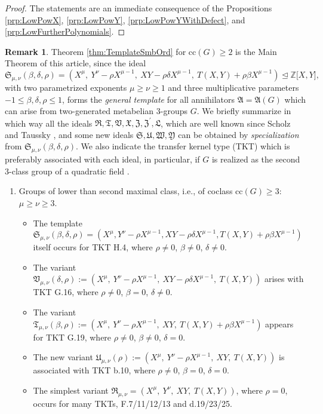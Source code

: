 \documentclass{amsart}
\theoremstyle{definition}
\newtheorem{remark}{Remark}[section]
\numberwithin{equation}{section}
\begin{document}
\begin{proof}
The statements are an immediate consequence of the Propositions
\ref{prp:LowPowX},
\ref{prp:LowPowY},
\ref{prp:LowPowYWithDefect},
and
\ref{prp:LowFurtherPolynomials}.
\end{proof}


\begin{remark}
\label{rmk:TemplateSmbOrd}
Theorem
\ref{thm:TemplateSmbOrd}
for \(\mathrm{cc}(G)\ge 2\)
is the Main Theorem of this article, since the ideal
\[\mathfrak{S}_{\mu,\nu}(\beta,\delta,\rho)
=\left(X^{\mu},\ Y^{\nu}-\rho X^{\mu-1},\ XY-\rho\delta X^{\mu-1},\ T(X,Y)+\rho\beta X^{\mu-1}\right)
\unlhd\mathbb{Z}\lbrack X,Y\rbrack,\]
with two parametrized exponents \(\mu\ge\nu\ge 1\) and three multiplicative parameters \(-1\le\beta,\delta,\rho\le 1\),
forms the \textit{general template} for all annihilators \(\mathfrak{A}=\mathfrak{A}(G)\)
which can arise from two-generated metabelian \(3\)-groups \(G\).
We briefly summarize in which way all the ideals
\(\mathfrak{R},\mathfrak{T},\mathfrak{V},\mathfrak{X},\mathfrak{Z},\mathfrak{Z}^\prime,\mathfrak{L}\),
which are well known since Scholz and Taussky
\cite[(6), p. 32]{SoTa},
and some new ideals \(\mathfrak{S},\mathfrak{U},\mathfrak{W},\mathfrak{Y}\)
can be obtained by \textit{specialization} from \(\mathfrak{S}_{\mu,\nu}(\beta,\delta,\rho)\).
We also indicate the transfer kernel type (TKT)
\cite{Ma2}
which is preferably associated with each ideal,
in particular, if \(G\) is realized as the second \(3\)-class group of a quadratic field
\cite{Ma4}.

\begin{enumerate}

\item
Groups of lower than second maximal class, i.e., of coclass \(\mathrm{cc}(G)\ge 3\):
\(\mu\ge\nu\ge 3\).

\begin{itemize}
\item
The template
\(\mathfrak{S}_{\mu,\nu}(\beta,\delta,\rho)
=\left(X^{\mu},Y^{\nu}-\rho X^{\mu-1},XY-\rho\delta X^{\mu-1},T(X,Y)+\rho\beta X^{\mu-1}\right)\)
itself occurs for TKT H.4, where \(\rho\ne 0\), \(\beta\ne 0\), \(\delta\ne 0\).
\item
The variant
\(\mathfrak{V}_{\mu,\nu}(\delta,\rho)
:=\left(X^{\mu},\ Y^{\nu}-\rho X^{\mu-1},\ XY-\rho\delta X^{\mu-1},\ T(X,Y)\right)\)
arises with TKT G.16, where \(\rho\ne 0\), \(\beta=0\), \(\delta\ne 0\).
\item
The variant
\(\mathfrak{T}_{\mu,\nu}(\beta,\rho)
:=\left(X^{\mu},\ Y^{\nu}-\rho X^{\mu-1},\ XY,\ T(X,Y)+\rho\beta X^{\mu-1}\right)\)
appears for TKT G.19, where \(\rho\ne 0\), \(\beta\ne 0\), \(\delta=0\).
\item
The new variant
\(\mathfrak{U}_{\mu,\nu}(\rho)
:=\left(X^{\mu},\ Y^{\nu}-\rho X^{\mu-1},\ XY,\ T(X,Y)\right)\)
is associated with TKT b.10, where \(\rho\ne 0\), \(\beta=0\), \(\delta=0\).
\item
The simplest variant
\(\mathfrak{R}_{\mu,\nu}
=\left(X^{\mu},\ Y^{\nu},\ XY,\ T(X,Y)\right)\), where \(\rho=0\),
occurs for many TKTs, F.7/11/12/13 and d.19/23/25.
\end{itemize}


\end{enumerate}
\end{remark}
\end{document}
